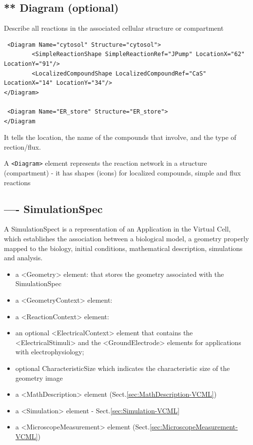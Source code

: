 \subsection{** Diagram (optional)}
\label{sec:Diagram-VCML}

Describe all reactions in the associated cellular structure or compartment 
\begin{verbatim}
 <Diagram Name="cytosol" Structure="cytosol">
        <SimpleReactionShape SimpleReactionRef="JPump" LocationX="62" LocationY="91"/>
        <LocalizedCompoundShape LocalizedCompoundRef="CaS" LocationX="14" LocationY="34"/>
</Diagram>

 <Diagram Name="ER_store" Structure="ER_store">
</Diagram        
\end{verbatim}

It tells the location, the name of the compounds that involve, and the type of
rection/flux.

A \verb!<Diagram>! element represents the reaction network in a structure
(compartment) - it has shapes (icons) for localized compounds, simple and flux reactions
  

\subsection{---- SimulationSpec}
\label{sec:SimulationSpec-VCML}
\label{sec:Application-VCML}

A SimulationSpect is a representation of an Application in the Virtual Cell,
which establishes the association between a biological model, a geometry
properly mapped to the biology, initial conditions, mathematical description,
simulations and analysis.
\begin{itemize}
  \item a <Geometry> element: that stores the geometry associated with the
  SimulationSpec

  \item a <GeometryContext> element:
  
  \item a <ReactionContext> element:
  
  \item an optional <ElectricalContext> element that contains the
  <ElectricalStimuli> and the <GroundElectrode> elements for applications with electrophysiology;
  
  \item  optional CharacteristicSize which indicates the characteristic size of
  the geometry image
  

  \item a <MathDescription> element (Sect.\ref{sec:MathDescription-VCML})
  
  \item a <Simulation> element - Sect.\ref{sec:Simulation-VCML}   
  
  \item a <MicroscopeMeasurement> element
  (Sect.\ref{sec:MicroscopeMeasurement-VCML})
\end{itemize}

